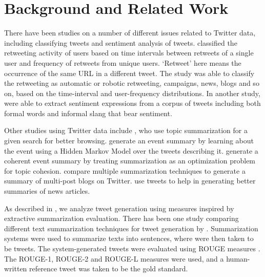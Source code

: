 \section{Background and Related Work}
\label{sec:background}

There have been studies on a number of different issues related to Twitter data, including classifying tweets and sentiment analysis of tweets.  classified the retweeting activity of users based on time intervals between retweets of a single user and frequency of retweets from unique users. `Retweet' here means the occurrence of the same URL in a different tweet. The study was able to classify the retweeting as automatic or robotic retweeting, campaigns, news, blogs and so on, based on the time-interval and user-frequency distributions. In another study,  were able to extract sentiment expressions from a corpus of tweets including both formal words and informal slang that bear sentiment.

Other studies using Twitter data include , who use topic summarization for a given search for better browsing.  generate an event summary by learning about the event using a Hidden Markov Model over the tweets describing it.  generate a coherent event summary by treating summarization as an optimization problem for topic cohesion.  compare multiple summarization techniques to generate a summary of multi-post blogs on Twitter.  use tweets to help in generating better summaries of news articles.

As described in , we analyze tweet generation using measures inspired by extractive summarization evaluation. There has been one study comparing different text summarization techniques for tweet generation by . Summarization systems were used to summarize texts into sentences, where were then taken to be tweets. The system-generated tweets were evaluated using ROUGE measures \cite{lin2004rouge}. The ROUGE-1, ROUGE-2 and ROUGE-L measures were used, and a human-written reference tweet was taken to be the gold standard. %


